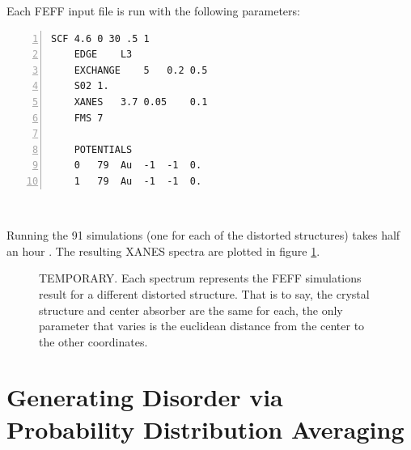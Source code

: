 \begin{minipage}{\linewidth}
Each FEFF input file is run with the following parameters: 
\begin{Verbatim}[samepage=true, numbers=left]
    SCF 4.6 0 30 .5 1
    EDGE    L3
    EXCHANGE    5   0.2 0.5
    S02 1.
    XANES   3.7 0.05    0.1
    FMS 7

    POTENTIALS
    0	79	Au	-1	-1	0.
    1	79	Au	-1	-1	0.
\end{Verbatim}
~
\end{minipage}

Running the 91 simulations (one for each of the distorted structures) takes half an hour . The resulting XANES spectra are plotted in figure \ref{fig:feff-results}.

\begin{figure}[h]
	\centering
	\caption[FEFF Simulations Results]{TEMPORARY. Each spectrum represents the FEFF simulations result for a different distorted structure. That is to say, the crystal structure and center absorber are the same for each, the only parameter that varies is the euclidean distance from the center to the other coordinates.}
	\label{fig:feff-results}
\end{figure}

\section{Generating Disorder via Probability Distribution Averaging}

